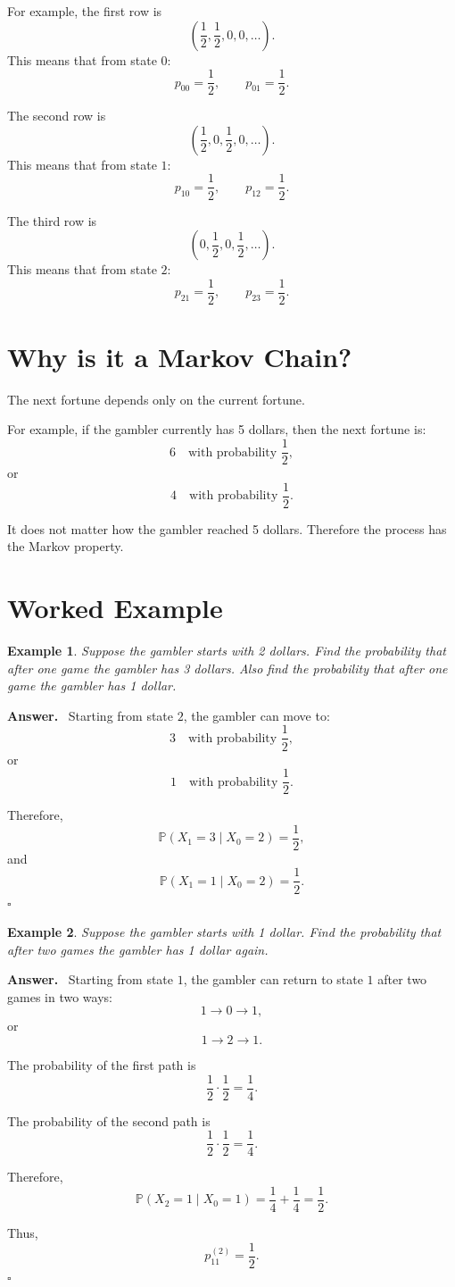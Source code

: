\documentclass[12pt,a4paper]{article}
\theoremstyle{notestyle}
\newtheorem{example}{Example}
\newenvironment{answer}
{\par\textbf{Answer.}\ }
{\hfill$\square$\par}
\newcommand{\Prob}{\mathbb{P}}
\begin{document}
For example, the first row is
\[
\left(\frac12,\frac12,0,0,\ldots\right).
\]
This means that from state $0$:
\[
p_{00}=\frac12,
\qquad
p_{01}=\frac12.
\]

The second row is
\[
\left(\frac12,0,\frac12,0,\ldots\right).
\]
This means that from state $1$:
\[
p_{10}=\frac12,
\qquad
p_{12}=\frac12.
\]

The third row is
\[
\left(0,\frac12,0,\frac12,\ldots\right).
\]
This means that from state $2$:
\[
p_{21}=\frac12,
\qquad
p_{23}=\frac12.
\]

\section{Why is it a Markov Chain?}

The next fortune depends only on the current fortune.

For example, if the gambler currently has 5 dollars, then the next fortune is:
\[
6 \quad\text{with probability }\frac12,
\]
or
\[
4 \quad\text{with probability }\frac12.
\]

It does not matter how the gambler reached 5 dollars. Therefore the process has the Markov property.

\section{Worked Example}

\begin{example}
Suppose the gambler starts with 2 dollars. Find the probability that after one game the gambler has 3 dollars. Also find the probability that after one game the gambler has 1 dollar.
\end{example}

\begin{answer}
Starting from state $2$, the gambler can move to:
\[
3
\quad\text{with probability }\frac12,
\]
or
\[
1
\quad\text{with probability }\frac12.
\]

Therefore,
\[
\Prob(X_1=3\mid X_0=2)=\frac12,
\]
and
\[
\Prob(X_1=1\mid X_0=2)=\frac12.
\]
\end{answer}

\begin{example}
Suppose the gambler starts with 1 dollar. Find the probability that after two games the gambler has 1 dollar again.
\end{example}

\begin{answer}
Starting from state $1$, the gambler can return to state $1$ after two games in two ways:
\[
1\to 0\to 1,
\]
or
\[
1\to 2\to 1.
\]

The probability of the first path is
\[
\frac12\cdot\frac12=\frac14.
\]

The probability of the second path is
\[
\frac12\cdot\frac12=\frac14.
\]

Therefore,
\[
\Prob(X_2=1\mid X_0=1)
=
\frac14+\frac14
=
\frac12.
\]

Thus,
\[
\boxed{p_{11}^{(2)}=\frac12.}
\]
\end{answer}
\end{document}
